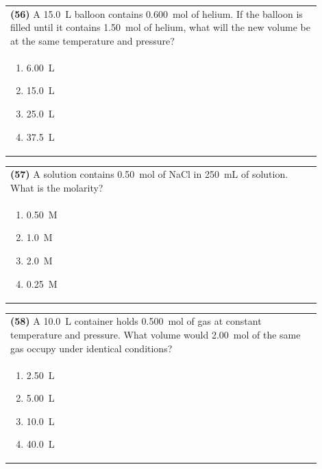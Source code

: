 \documentclass{article}
\begin{document}
\vspace{0.2cm}
\noindent\begin{tabular}{|p{0.9\linewidth}|}
\hline
\textbf{(56)} A 15.0~L balloon contains 0.600~mol of helium. If the balloon is filled until it contains 1.50~mol of helium, what will the new volume be at the same temperature and pressure?\\[0.2cm]
\begin{minipage}[t]{0.85\linewidth}
\begin{enumerate}[label=\alph*.]
\item 6.00~L
\item 15.0~L
\item 25.0~L
\item 37.5~L
\end{enumerate}
\end{minipage}\\[0.2cm]
\hline
\end{tabular}
\newpage

\vspace{0.2cm}
\noindent\begin{tabular}{|p{0.9\linewidth}|}
\hline
\textbf{(57)} A solution contains 0.50~mol of NaCl in 250~mL of solution. What is the molarity?\\[0.2cm]
\begin{minipage}[t]{0.85\linewidth}
\begin{enumerate}[label=\alph*.]
\item 0.50~M
\item 1.0~M
\item 2.0~M
\item 0.25~M
\end{enumerate}
\end{minipage}\\[0.2cm]
\hline
\end{tabular}

\vspace{0.2cm}
\noindent\begin{tabular}{|p{0.9\linewidth}|}
\hline
\textbf{(58)} A 10.0~L container holds 0.500~mol of gas at constant temperature and pressure. What volume would 2.00~mol of the same gas occupy under identical conditions?\\[0.2cm]
\begin{minipage}[t]{0.85\linewidth}
\begin{enumerate}[label=\alph*.]
\item 2.50~L
\item 5.00~L
\item 10.0~L
\item 40.0~L
\end{enumerate}
\end{minipage}\\[0.2cm]
\hline
\end{tabular}
\end{document}
